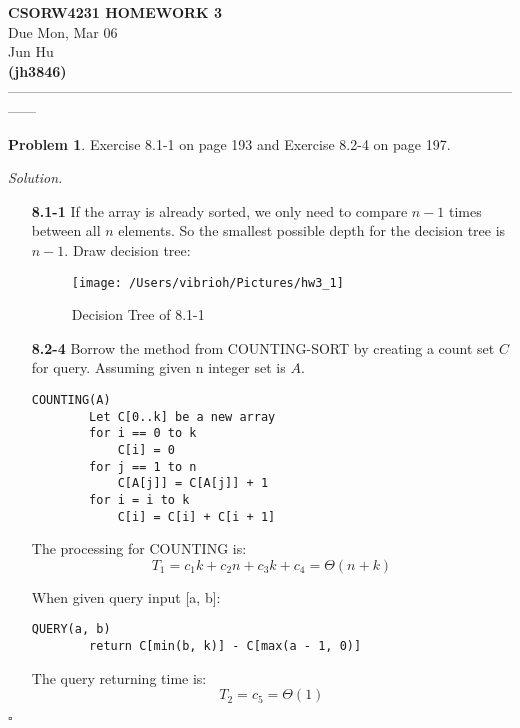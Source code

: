 \documentclass[11pt]{article}
\theoremstyle{definition}
\newtheorem{problem}{Problem}
\newenvironment{solution}{\noindent\emph{Solution.}}{\hfill$\square$}
\begin{document}
\begin{center}
\Large{} 
\textbf{CSORW4231 HOMEWORK 3} \\
\normalsize{}
Due Mon, Mar 06 \\
\large{Jun Hu \\
\textbf{(jh3846)}} \\ 
------------------------------------------------------------------------------------------------------------------
\end{center}

\begin{problem}
\large{Exercise 8.1-1 on page 193 and Exercise 8.2-4 on page 197. }
\end{problem}

\begin{solution}
\begin{enumerate}
    \item[\textbf{8.1-1}]
    If the array is already sorted, we only need to compare $n-1$ times between all $n$ elements. So the smallest possible depth for the decision tree is $n-1$. Draw decision tree:
    \begin{figure}[htbp]
  \centering
  \texttt{[image: /Users/vibrioh/Pictures/hw3\_1]}
  \caption{Decision Tree of 8.1-1}
  \label{fig:shapes}
\end{figure}
    
    
    
    
    \item[\textbf{8.2-4}]
    Borrow the method from COUNTING-SORT by creating a count set $C$ for query.
    Assuming given n integer set is $A$.
    \begin{lstlisting}
COUNTING(A)
		Let C[0..k] be a new array
		for i == 0 to k
			C[i] = 0
		for j == 1 to n
			C[A[j]] = C[A[j]] + 1
		for i = i to k
			C[i] = C[i] + C[i + 1]	
\end{lstlisting}
The processing for COUNTING is:
$$T_1 = c_1k + c_2n + c_3k + c_4 = \Theta(n + k)$$

When given query input [a, b]:
 \begin{lstlisting}
QUERY(a, b)
		return C[min(b, k)] - C[max(a - 1, 0)]
\end{lstlisting}
The query returning time is:
$$T_2 = c_5 = \Theta(1)$$





\end{enumerate}

\end{solution}
\end{document}
